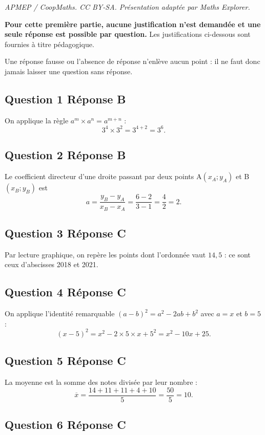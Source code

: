 \documentclass[10pt]{article}
\begin{document}
\noindent\textit{APMEP / CoopMaths. CC BY-SA. Présentation adaptée par Maths Explorer.}\par\medskip
\textbf{Pour cette première partie, aucune justification n'est demandée et une seule réponse est possible par question.} Les justifications ci-dessous sont fournies à titre pédagogique.

Une réponse fausse ou l'absence de réponse n'enlève aucun point : il ne faut donc jamais laisser une question sans réponse.

\subsection*{Question 1 \quad Réponse B}

On applique la règle $a^m \times a^n = a^{m+n}$ :
\[3^4 \times 3^2 = 3^{4+2} = 3^6.\]

\subsection*{Question 2 \quad Réponse B}

Le coefficient directeur d'une droite passant par deux points A$(x_A ; y_A)$ et
B$(x_B ; y_B)$ est
\[a = \dfrac{y_B - y_A}{x_B - x_A} = \dfrac{6-2}{3-1} = \dfrac{4}{2} = 2.\]

\subsection*{Question 3 \quad Réponse C}

Par lecture graphique, on repère les points dont l'ordonnée vaut $14,5$ : ce sont ceux
d'abscisses 2018 et 2021.

\subsection*{Question 4 \quad Réponse C}

On applique l'identité remarquable $(a-b)^2 = a^2 - 2ab + b^2$ avec $a = x$ et $b = 5$ :
\[(x-5)^2 = x^2 - 2\times 5 \times x + 5^2 = x^2 - 10x + 25.\]

\subsection*{Question 5 \quad Réponse C}

La moyenne est la somme des notes divisée par leur nombre :
\[\overline{x} = \dfrac{14+11+11+4+10}{5} = \dfrac{50}{5} = 10.\]

\subsection*{Question 6 \quad Réponse C}
\end{document}
